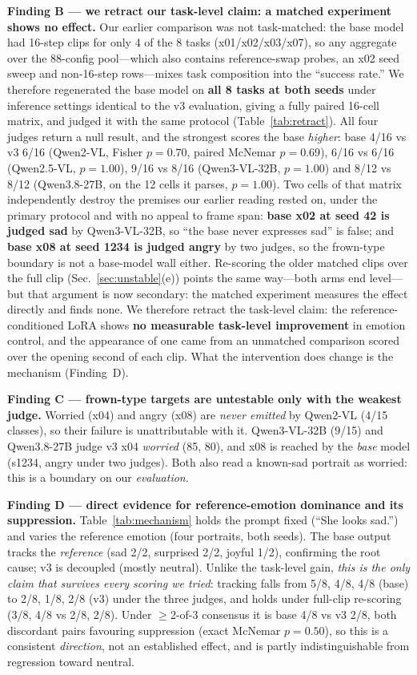 \documentclass[conference]{IEEEtran}
\begin{document}
\textbf{Finding B --- we retract our task-level claim: a matched experiment shows no effect.} Our earlier
comparison was not task-matched: the base model had 16-step clips for only 4 of the 8 tasks
(x01/x02/x03/x07), so any aggregate over the 88-config pool---which also contains reference-swap probes,
an x02 seed sweep and non-16-step rows---mixes task composition into the ``success rate.'' We therefore
regenerated the base model on \textbf{all 8 tasks at both seeds} under inference settings identical to the
v3 evaluation, giving a fully paired 16-cell matrix, and judged it with the same protocol
(Table~\ref{tab:retract}). All four judges return a null result, and the strongest scores the base
\emph{higher}: base 4/16 vs v3 6/16 (Qwen2-VL, Fisher $p{=}0.70$, paired McNemar $p{=}0.69$), 6/16 vs
6/16 (Qwen2.5-VL, $p{=}1.00$), 9/16 vs 8/16 (Qwen3-VL-32B, $p{=}1.00$) and 8/12 vs 8/12 (Qwen3.8-27B, on
the 12 cells it parses, $p{=}1.00$). Two cells of that matrix
independently destroy the premises our earlier reading rested on, under the primary protocol and with no
appeal to frame span: \textbf{base x02 at seed 42 is judged sad} by Qwen3-VL-32B, so ``the base never
expresses sad'' is false; and \textbf{base x08 at seed 1234 is judged angry} by two judges, so the
frown-type boundary is not a base-model wall either. Re-scoring the older matched clips over the full clip
(Sec.~\ref{sec:unstable}(e)) points the same way---both arms end level---but that argument is now
secondary: the matched experiment measures the effect directly and finds none. We therefore retract the task-level claim: the reference-conditioned
LoRA shows \textbf{no measurable task-level improvement} in emotion control, and the appearance of one
came from an unmatched comparison scored over the opening second of each clip. What the intervention does
change is the mechanism (Finding~D).

\textbf{Finding C --- frown-type targets are untestable only with the weakest judge.} Worried (x04) and
angry (x08) are \emph{never emitted} by Qwen2-VL (4/15 classes), so their failure is unattributable with
it. Qwen3-VL-32B (9/15) and Qwen3.8-27B judge v3 x04 \emph{worried} (85, 80), and x08 is reached by the
\emph{base} model (s1234, angry under two judges). Both also read a known-sad portrait as worried: this is
a boundary on our \emph{evaluation}.

\textbf{Finding D --- direct evidence for reference-emotion dominance and its suppression.}
\label{sec:mech}
Table~\ref{tab:mechanism} holds the prompt fixed (``She looks sad.'') and varies the reference emotion
(four portraits, both seeds). The base output tracks the \emph{reference} (sad 2/2, surprised 2/2, joyful
1/2), confirming the root cause; v3 is decoupled (mostly neutral). Unlike the task-level gain,
\emph{this is the only claim that survives every scoring we tried}: tracking falls from 5/8, 4/8, 4/8
(base) to 2/8, 1/8, 2/8 (v3) under the three judges, and holds under full-clip re-scoring (3/8, 4/8 vs
2/8, 2/8). Under $\ge$2-of-3 consensus it is base 4/8 vs v3 2/8, both discordant pairs favouring
suppression (exact McNemar $p{=}0.50$), so this is a consistent \emph{direction}, not an established
effect, and is partly indistinguishable from regression toward neutral.
\end{document}
